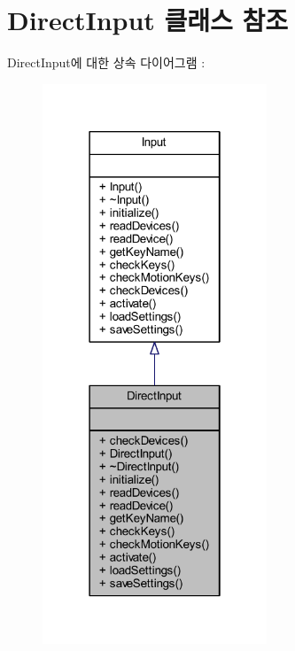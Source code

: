 \hypertarget{class_direct_input}{}\section{Direct\+Input 클래스 참조}
\label{class_direct_input}


Direct\+Input에 대한 상속 다이어그램 \+: \nopagebreak
\begin{figure}[H]
\begin{center}
\leavevmode
\includegraphics[width=190pt]{class_direct_input__inherit__graph}
\end{center}
\end{figure}


